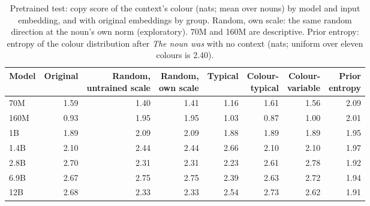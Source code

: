 \begin{table}[!htbp]
\centering\small

\begin{tabular}{@{}lrrrrrrr@{}}
\toprule
Model & Original & \shortstack{Random,\\untrained scale} & \shortstack{Random,\\own scale} & Typical & \shortstack{Colour-\\typical} & \shortstack{Colour-\\variable} & \shortstack{Prior\\entropy} \\
\midrule
70M & 1.59 & 1.40 & 1.41 & 1.16 & 1.61 & 1.56 & 2.09 \\
160M & 0.93 & 1.95 & 1.95 & 1.03 & 0.87 & 1.00 & 2.01 \\
1B & 1.89 & 2.09 & 2.09 & 1.88 & 1.89 & 1.89 & 1.95 \\
1.4B & 2.10 & 2.44 & 2.44 & 2.66 & 2.10 & 2.10 & 1.97 \\
2.8B & 2.70 & 2.31 & 2.31 & 2.23 & 2.61 & 2.78 & 1.92 \\
6.9B & 2.67 & 2.75 & 2.75 & 2.39 & 2.63 & 2.72 & 1.94 \\
12B & 2.68 & 2.33 & 2.33 & 2.54 & 2.73 & 2.62 & 1.91 \\
\bottomrule
\end{tabular}
\caption{Pretrained test: copy score of the context's colour (nats; mean over nouns) by model and input embedding, and with original embeddings by group. Random, own scale: the same random direction at the noun's own norm (exploratory). 70M and 160M are descriptive. Prior entropy: entropy of the colour distribution after \emph{The \textit{noun} was} with no context (nats; uniform over eleven colours is 2.40).}
\label{tab:N7}
\end{table}

